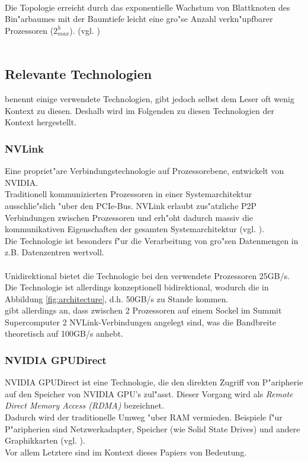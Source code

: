 \\
Die Topologie erreicht durch das exponentielle Wachstum von Blattknoten des Bin"arbaumes mit der Baumtiefe leicht eine gro"se Anzahl verkn"upfbarer Prozessoren ($2^h_{max}$). (vgl. \cite{fattree})\\
\\


\subsection{Relevante Technologien}
\cite{mainpaper} benennt einige verwendete Technologien, gibt jedoch selbst dem Leser oft wenig Kontext zu diesen. Deshalb wird im Folgenden zu diesen Technologien der Kontext hergestellt.

\subsubsection{ NVLink }
Eine propriet"are Verbindungstechnologie auf Prozessorebene, entwickelt von NVIDIA.\\
Traditionell kommunizierten Prozessoren in einer Systemarchitektur ausschlie"slich "uber den PCIe-Bus. NVLink erlaubt zus"atzliche P2P Verbindungen zwischen Prozessoren und erh"oht dadurch massiv die kommunikativen Eigenschaften der gesamten Systemarchitektur (vgl. \cite{nvlink}).\\
Die Technologie ist besonders f"ur die Verarbeitung von gro"sen Datenmengen in z.B. Datenzentren wertvoll.\\
\\
Unidirektional bietet die Technologie bei den verwendete Prozessoren 25GB/s. Die Technologie ist allerdings konzeptionell bidirektional, wodurch die in Abbildung \ref{fig:architecture}, d.h. \cite[Abb. 1]{mainpaper} 50GB/s zu Stande kommen.\\
\cite[FAQ, What is NVLink?]{osummit} gibt allerdings an, dass zwischen 2 Prozessoren auf einem Sockel im Summit Supercomputer 2 NVLink-Verbindungen angelegt sind, was die Bandbreite theoretisch auf 100GB/s anhebt.

\subsubsection{ NVIDIA GPUDirect }
NVIDIA GPUDirect ist eine Technologie, die den direkten Zugriff von P"aripherie auf den Speicher von NVIDIA GPU's zul"asst. Dieser Vorgang wird als \textit{Remote Direct Memory Access (RDMA)} bezeichnet.\\
Dadurch wird der traditionelle Umweg "uber RAM vermieden. Beispiele f"ur P"aripherien sind Netzwerkadapter, Speicher (wie Solid State Drives) und andere Graphikkarten (vgl. \cite{gpud}).\\
Vor allem Letztere sind im Kontext dieses Papiers von Bedeutung.

